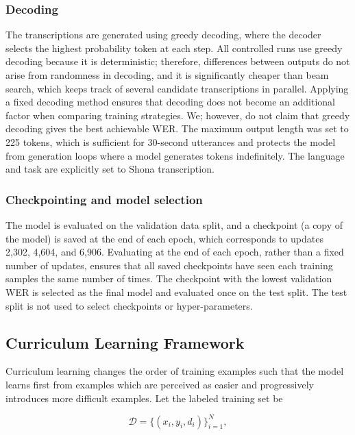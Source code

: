 {\subsubsection{Decoding}
\label{sec:decoding}

The transcriptions are generated using greedy decoding, where the decoder selects
the highest probability token at each step. All controlled runs use greedy decoding because it is deterministic; therefore, differences between outputs do not arise from randomness in decoding, and it is significantly cheaper than beam search, which keeps track of several candidate
transcriptions in parallel. Applying a fixed decoding method ensures that
decoding does not become an additional factor when comparing training strategies. We; however, do not claim that greedy decoding gives the best achievable WER.
The maximum output length was set to 225 tokens, which is sufficient for 30-second utterances and protects the model from generation loops where a model generates tokens indefinitely. The language and task are explicitly set to Shona transcription. 


\subsubsection{Checkpointing and model selection}
\label{sec:checkpointing}

The model is evaluated on the validation data split, and a checkpoint (a
copy of the model) is saved at the end of each epoch, which corresponds to updates
2,302, 4,604, and 6,906. Evaluating at the end of each epoch, rather than a fixed
number of updates, ensures that all saved checkpoints have seen each training
samples the same number of times. The checkpoint with the lowest validation WER is selected as the final model and evaluated once on the test split. The test split is not used to select checkpoints or hyper-parameters.

\subsection{Curriculum Learning Framework}

Curriculum learning changes the order of training examples such that the model learns first from examples which are perceived as easier and progressively introduces more difficult examples. Let the labeled training set be

\begin{equation}
  \mathcal{D} = \{(x_i, y_i, d_i)\}_{i=1}^N,  
\end{equation}

}
